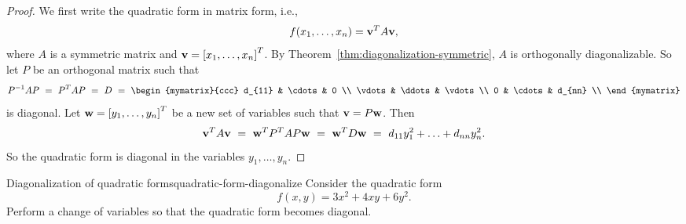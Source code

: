 \begin{proof}
  We first write the quadratic form in matrix form, i.e.,
  \begin{equation*}
    f(x_1,\ldots,x_n) = \vect{v}^T A \vect{v},
  \end{equation*}
  where $A$ is a symmetric matrix and
  $\vect{v}=\mat{x_1,\ldots,x_n}^T$. By
  Theorem~\ref{thm:diagonalization-symmetric}, $A$ is orthogonally
  diagonalizable. So let $P$ be an orthogonal matrix such that
  \begin{equation*}
    P^{-1}AP
    ~=~ P^TAP
    ~=~ D
    ~=~ \begin{mymatrix}{ccc}
      d_{11} & \cdots & 0      \\
      \vdots & \ddots & \vdots \\
      0      & \cdots & d_{nn} \\
    \end{mymatrix}
  \end{equation*}
  is diagonal. Let $\vect{w}=\mat{y_1,\ldots,y_n}^T$ be a new set of
  variables such that $\vect{v} = P \vect{w}$.  Then
  \begin{equation*}
    \vect{v}^T A \vect{v}
    ~=~ \vect{w}^T P^TAP \vect{w}
    ~=~ \vect{w}^T D \vect{w}
    ~=~ d_{11}y_1^2 + \ldots + d_{nn}y_n^2.
  \end{equation*}
  So the quadratic form is diagonal in the variables $y_1,\ldots,y_n$.
\end{proof}

\begin{example}{Diagonalization of quadratic forms}{quadratic-form-diagonalize}
  Consider the quadratic form
  \begin{equation*}
    f(x,y) = 3x^2 + 4xy + 6y^2.
  \end{equation*}
  Perform a change of variables so that the quadratic form becomes diagonal.
\end{example}

